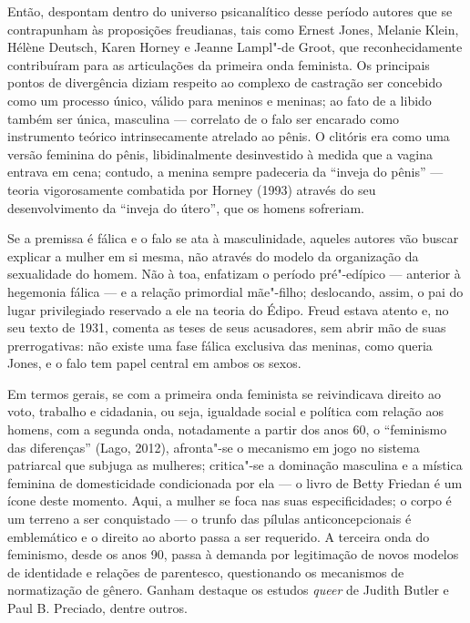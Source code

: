 Então, despontam dentro do universo psicanalítico desse período autores
que se contrapunham às proposições freudianas, tais como Ernest Jones,
Melanie Klein, Hélène Deutsch, Karen Horney e Jeanne Lampl"-de Groot, que
reconhecidamente contribuíram para as articulações da primeira onda
feminista. Os principais pontos de divergência diziam respeito ao
complexo de castração ser concebido como um processo único, válido para
meninos e meninas; ao fato de a libido também ser única, masculina ---
correlato de o falo ser encarado como instrumento teórico
intrinsecamente atrelado ao pênis. O clitóris era como uma versão
feminina do pênis, libidinalmente desinvestido à medida que a vagina
entrava em cena; contudo, a menina sempre padeceria da ``inveja do
pênis'' --- teoria vigorosamente combatida por Horney (1993)
através do seu desenvolvimento da ``inveja do útero'', que os homens
sofreriam.

Se a premissa é fálica e o falo se ata à masculinidade, aqueles autores
vão buscar explicar a mulher em si mesma, não através do modelo da
organização da sexualidade do homem. Não à toa, enfatizam o período
pré"-edípico --- anterior à hegemonia fálica --- e a relação primordial
mãe"-filho; deslocando, assim, o pai do lugar privilegiado reservado a
ele na teoria do Édipo. Freud estava atento e, no seu texto de 1931,
comenta as teses de seus acusadores, sem abrir mão de suas
prerrogativas: não existe uma fase fálica exclusiva das meninas, como
queria Jones, e o falo tem papel central em ambos os sexos.

Em termos gerais, se com a primeira onda feminista se reivindicava
direito ao voto, trabalho e cidadania, ou seja, igualdade social e
política com relação aos homens, com a segunda onda, notadamente a
partir dos anos 60, o ``feminismo das diferenças'' (Lago, 2012),
afronta"-se o mecanismo em jogo no sistema patriarcal que subjuga as
mulheres; critica"-se a dominação masculina e a mística feminina de
domesticidade condicionada por ela --- o livro de Betty Friedan é um
ícone deste momento. Aqui, a mulher se foca nas suas especificidades; o
corpo é um terreno a ser conquistado --- o trunfo das pílulas
anticoncepcionais é emblemático e o direito ao aborto passa a ser
requerido. A terceira onda do feminismo, desde os anos 90, passa à
demanda por legitimação de novos modelos de identidade e relações de
parentesco, questionando os mecanismos de normatização de gênero. Ganham
destaque os estudos \emph{queer} de Judith Butler e Paul B. Preciado,
dentre outros.

